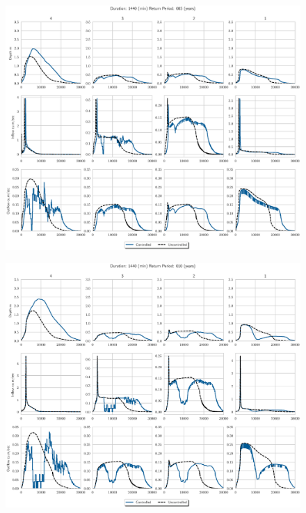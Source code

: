 \begin{figure}
    \centering
    \includegraphics[width=\linewidth]{./RL-SI-figures/77storms/1440005.eps}
\end{figure}
\begin{figure}
    \centering
    \includegraphics[width=\linewidth]{./RL-SI-figures/77storms/1440010.eps}
\end{figure}
